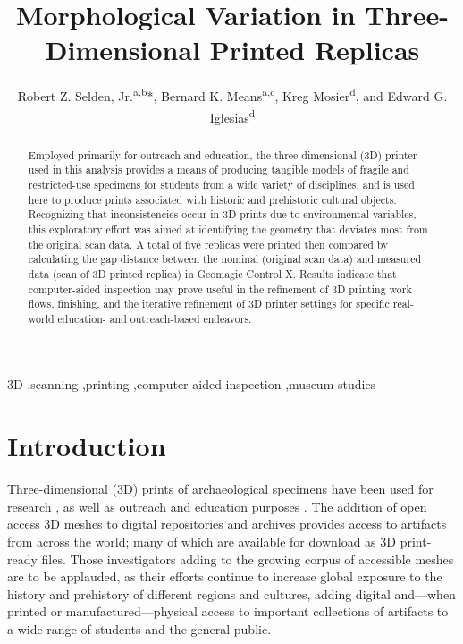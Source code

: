 \documentclass[review]{elsarticle}
\begin{document}
\begin{frontmatter}

\title{Morphological Variation in Three-Dimensional Printed Replicas}

\author{Robert Z. Selden, Jr.\textsuperscript{a,b}*, Bernard K. Means\textsuperscript{a,c}, Kreg Mosier\textsuperscript{d}, and Edward G. Iglesias\textsuperscript{d}}
\address[1]{Heritage Research Center, Stephen F. Austin State University, US}
\address[2]{Cultural Heritage Department, Jean Monnet University, FR}
\address[3]{Virtual Curation Laboratory, Virginia Commonwealth University, US}
\address[4]{Ralph W. Steen Library, Stephen F. Austin State University, US}

\begin{abstract}
Employed primarily for outreach and education, the three-dimensional (3D) printer used in this analysis provides a means of producing tangible models of fragile and restricted-use specimens for students from a wide variety of disciplines, and is used here to produce prints associated with historic and prehistoric cultural objects. Recognizing that inconsistencies occur in 3D prints due to environmental variables, this exploratory effort was aimed at identifying the geometry that deviates most from the original scan data. A total of five replicas were printed then compared by calculating the gap distance between the nominal (original scan data) and measured data (scan of 3D printed replica) in Geomagic Control X. Results indicate that computer-aided inspection may prove useful in the refinement of 3D printing work flows, finishing, and the iterative refinement of 3D printer settings for specific real-world education- and outreach-based endeavors.
\end{abstract}

\begin{keyword}
3D \sep scanning \sep printing \sep computer aided inspection \sep museum studies
\end{keyword}

\end{frontmatter}

\section{Introduction}

Three-dimensional (3D) prints of archaeological specimens have been used for research \citep{RN11511,RN5942,RN5941,RN5943}, as well as outreach and education purposes \citep{RN11509,RN5944,RN5945,RN11508,RN11505}. The addition of open access 3D meshes to digital repositories and archives \citep{RN5932,RN11507,RN5922} provides access to artifacts from across the world; many of which are available for download as 3D print-ready files. Those investigators adding to the growing corpus of accessible meshes are to be applauded, as their efforts continue to increase global exposure to the history and prehistory of different regions and cultures, adding digital and---when printed or manufactured---physical access to important collections of artifacts to a wide range of students and the general public.
\end{document}
